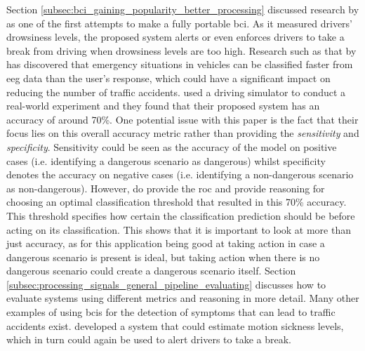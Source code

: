 Section \ref{subsec:bci_gaining_popularity_better_processing} discussed research by \citet{early_bci_drowsiness} as one of the first attempts to make a fully portable \gls{bci}.
As it measured drivers' drowsiness levels, the proposed system alerts or even enforces drivers to take a break from driving when drowsiness levels are too high.
Research such as that by \citet{eeg_dangerous_situation_car} has discovered that emergency situations in vehicles can be classified faster from \gls{eeg} data than the user's response, which could have a significant impact on reducing the number of traffic accidents.
 used a driving simulator to conduct a real-world experiment and they found that their proposed system has an accuracy of around 70\%.
One potential issue with this paper is the fact that their focus lies on this overall accuracy metric rather than providing the \textit{sensitivity} and \textit{specificity}.
Sensitivity could be seen as the accuracy of the model on positive cases (i.e. identifying a dangerous scenario as dangerous) whilst specificity denotes the accuracy on negative cases (i.e. identifying a non-dangerous scenario as non-dangerous).
However, \citet{eeg_dangerous_situation_car} do provide the \gls{roc} and provide reasoning for choosing an optimal classification threshold that resulted in this 70\% accuracy.
This threshold specifies how certain the classification prediction should be before acting on its classification.
This shows that it is important to look at more than just accuracy, as for this application being good at taking action in case a dangerous scenario is present is ideal, but taking action when there is no dangerous scenario could create a dangerous scenario itself.
Section \ref{subsec:processing_signals_general_pipeline_evaluating} discusses how to evaluate systems using different metrics and reasoning in more detail.
Many other examples of using \glspl{bci} for the detection of symptoms that can lead to traffic accidents exist. 
 developed a system that could estimate motion sickness levels, which in turn could again be used to alert drivers to take a break.

